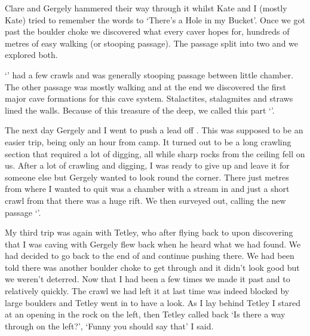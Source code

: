 Clare and Gergely hammered their way through it whilst Kate and I (mostly Kate) tried to remember the words to ‘There’s a Hole in my Bucket’. Once we got past the boulder choke we discovered what every caver hopes for, hundreds of metres of easy walking (or stooping passage). The passage split into two and we explored both.

‘’ had a few crawls and was generally stooping passage between little chamber. The other passage was mostly walking and at the end we discovered the first major cave formations for this cave system. Stalactites, stalagmites and straws lined the walls. Because of this treasure of the deep, we called this part ‘’.

The next day Gergely and I went to push a lead off . This was supposed to be an easier trip, being only an hour from camp. It turned out to be a long crawling section that required a lot of digging, all while sharp rocks from the ceiling fell on us. After a lot of crawling and digging, I was ready to give up and leave it for someone else but Gergely wanted to look round the corner. There just metres from where I wanted to quit was a chamber with a stream in and just a short crawl from that there was a huge rift. We then surveyed out, calling the new passage ‘’.

My third trip was again with Tetley, who after flying back to  upon discovering that I was caving with Gergely flew back when he heard what we had found. We had decided to go back to the end of  and continue pushing there. We had been told there was another boulder choke to get through and it didn’t look good but we weren’t deterred. Now that I had been a few times we made it past  and to  relatively quickly. The crawl we had left it at last time was indeed blocked by large boulders and Tetley went in to have a look. As I lay behind Tetley I stared at an opening in the rock on the left, then Tetley called back ‘Is there a way through on the left?’, ‘Funny you should say that’ I said.


